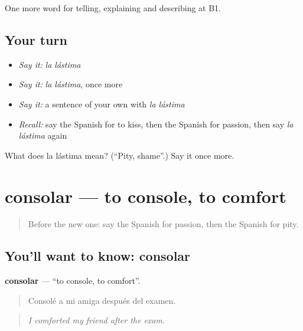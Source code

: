 \begin{grammarlens}[title={What you've built}]
One more word for telling, explaining and describing at B1.
\end{grammarlens}

\subsection*{Your turn}
\begin{itemize}
\raggedright
  \item \emph{Say it:} \emph{la lástima}
  \item \emph{Say it:} \emph{la lástima}, once more
  \item \emph{Say it:} a sentence of your own with \emph{la lástima}
  \item \emph{Recall:} say the Spanish for to kiss, then the Spanish for passion, then say \emph{la lástima} again
\end{itemize}

\begin{tcolorbox}[breakable,colback=teal!4,colframe=teal!35!black,title={Before you move on}]
What does la lástima mean? (\textquotedblleft{}Pity, shame\textquotedblright{}.) Say it once more.
\end{tcolorbox}
\section[consolar]{consolar — to console, to comfort}

\label{lesson:ES-C716-consolar}



\begin{quote}
Before the new one: say the Spanish for passion, then the Spanish for pity.
\end{quote}

\subsection*{You'll want to know: consolar}
\textbf{consolar} — \textquotedblleft{}to console, to comfort\textquotedblright{}.

\begin{quote}
Consolé a mi amiga después del examen.
\end{quote}

\begin{quote}
\emph{I comforted my friend after the exam.}
\end{quote}

